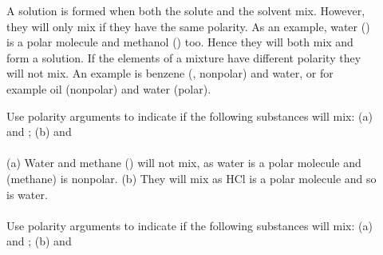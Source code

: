 \documentclass[main.tex]{subfiles} %
\begin{document}
\begin{description}
\item[] A solution is formed when both the solute and the solvent mix. However, they will only mix if they have the same polarity. As an example, water () is a polar molecule and methanol () too. Hence they will both mix and form a solution. If the elements of a mixture have different polarity they will not mix. An example is benzene (, nonpolar) and water, or for example oil (nonpolar) and water (polar). 

 
 


\begin{example} %
Use polarity arguments to indicate if the following substances will mix: (a)  and ; (b)  and 
\\
\\
(a) Water and methane () will not mix, as water is a polar molecule and  (methane) is nonpolar. (b) They will mix as HCl is a polar molecule and so is water.
\\
\faDiamond\ \\
Use polarity arguments to indicate if the following substances will mix: (a)  and ; (b)  and 
\\
\end{example}%






\end{description}
\end{document}
